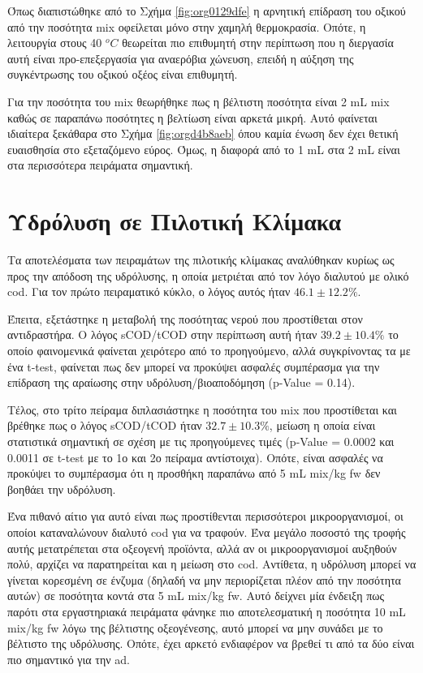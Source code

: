 \documentclass[11pt]{report}
\begin{document}
Όπως διαπιστώθηκε από το Σχήμα \ref{fig:org0129dfe} η αρνητική επίδραση του οξικού από την ποσότητα \acrshort{mix} οφείλεται μόνο στην χαμηλή θερμοκρασία. Οπότε, η λειτουργία στους 40 \(^oC\) θεωρείται πιο επιθυμητή στην περίπτωση που η διεργασία αυτή είναι προ-επεξεργασία για αναερόβια χώνευση, επειδή η αύξηση της συγκέντρωσης του οξικού οξέος είναι επιθυμητή.

Για την ποσότητα του \acrshort{mix} θεωρήθηκε πως η βέλτιστη ποσότητα είναι 2 mL \acrshort{mix} καθώς σε παραπάνω ποσότητες η βελτίωση είναι αρκετά μικρή. Αυτό φαίνεται ιδιαίτερα ξεκάθαρα στο Σχήμα \ref{fig:orgd4b8aeb} όπου καμία ένωση δεν έχει θετική ευαισθησία στο εξεταζόμενο εύρος. Όμως, η διαφορά από το 1 mL στα 2 mL είναι στα περισσότερα πειράματα σημαντική.

\section{Υδρόλυση σε Πιλοτική Κλίμακα}
\label{sec:orgbc0c959}
Τα αποτελέσματα των πειραμάτων της πιλοτικής κλίμακας αναλύθηκαν κυρίως ως προς την απόδοση της υδρόλυσης, η οποία μετριέται από τον λόγο διαλυτού με ολικό \acrshort{cod}. Για τον πρώτο πειραματικό κύκλο, ο λόγος αυτός ήταν \(46.1 \pm 12.2 \%\).

Έπειτα, εξετάστηκε η μεταβολή της ποσότητας νερού που προστίθεται στον αντιδραστήρα. Ο λόγος sCOD/tCOD στην περίπτωση αυτή ήταν \(39.2 \pm 10.4 \%\) το οποίο φαινομενικά φαίνεται χειρότερο από το προηγούμενο, αλλά συγκρίνοντας τα με ένα t-test, φαίνεται πως δεν μπορεί να προκύψει ασφαλές συμπέρασμα για την επίδραση της αραίωσης στην υδρόλυση/βιοαποδόμηση (p-Value = 0.14). 

Τέλος, στο τρίτο πείραμα διπλασιάστηκε η ποσότητα του \acrshort{mix} που προστίθεται και βρέθηκε πως ο λόγος sCOD/tCOD ήταν \(32.7 \pm 10.3 \%\), μείωση η οποία είναι στατιστικά σημαντική σε σχέση με τις προηγούμενες τιμές (p-Value = 0.0002 και 0.0011 σε t-test με το 1ο και 2ο πείραμα αντίστοιχα). Οπότε, είναι ασφαλές να προκύψει το συμπέρασμα ότι η προσθήκη παραπάνω από 5 mL \acrshort{mix}/kg \acrshort{fw} δεν βοηθάει την υδρόλυση.

Ένα πιθανό αίτιο για αυτό είναι πως προστίθενται περισσότεροι μικροοργανισμοί, οι οποίοι καταναλώνουν διαλυτό \acrshort{cod} για να τραφούν. Ένα μεγάλο ποσοστό της τροφής αυτής μετατρέπεται στα οξεογενή προϊόντα, αλλά αν οι μικροοργανισμοί αυξηθούν πολύ, αρχίζει να παρατηρείται και η μείωση στο \acrshort{cod}. Αντίθετα, η υδρόλυση μπορεί να γίνεται κορεσμένη σε ένζυμα (δηλαδή να μην περιορίζεται πλέον από την ποσότητα αυτών) σε ποσότητα κοντά στα 5 mL \acrshort{mix}/kg \acrshort{fw}. Αυτό δείχνει μία ένδειξη πως παρότι στα εργαστηριακά πειράματα φάνηκε πιο αποτελεσματική η ποσότητα 10 mL \acrshort{mix}/kg \acrshort{fw} λόγω της βέλτιστης οξεογένεσης, αυτό μπορεί να μην συνάδει με το βέλτιστο της υδρόλυσης. Οπότε, έχει αρκετό ενδιαφέρον να βρεθεί τι από τα δύο είναι πιο σημαντικό για την \acrshort{ad}.
\end{document}
